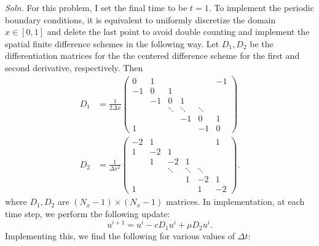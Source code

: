 \documentclass{article}
\begin{document}
\begin{itemize}
\begin{itemize}
        \newline\newline
        \textit{Soln.} For this problem, I set the final time to be $t = 1$. To implement the periodic boundary conditions, it is equivalent to uniformly discretize the domain $x \in [0,1]$ and delete the last point to avoid double counting and implement the spatial finite difference schemes in the following way. Let $D_1, D_2$ be the differentiation matrices for the the centered difference scheme for the first and second derivative, respectively. Then
        \begin{align*}
            D_1 &= \frac{1}{2\Delta x}\begin{pmatrix}
                0 & 1 &  &  &  & -1\\
                -1 & 0 & 1 &  &  & \\
                 & -1 & 0 & 1 &  & \\
                 & & \ddots & \ddots & \ddots &\\
                 &  & & -1 & 0 & 1\\
                1 &  &  & & -1 & 0
            \end{pmatrix}\\
            D_2 &= \frac{1}{\Delta x^2}\begin{pmatrix}
                -2 & 1 & & & & 1\\
                1 & -2 & 1 & & & \\
                & 1 & -2 & 1 & & \\
                & & \ddots & \ddots & \ddots & \\
                & & & 1 & -2 & 1\\
                1 & & & & 1 & -2
            \end{pmatrix}.
        \end{align*}
        where $D_1,D_2$ are $(N_x - 1) \times (N_x - 1)$ matrices. In implementation, at each time step, we perform the following update:
        \[u^{i + 1} = u^i - cD_1u^i + \mu D_2u^i.\]
        Implementing this, we find the following for various values of $\Delta t$:


\end{itemize}
\end{itemize}
\end{document}
